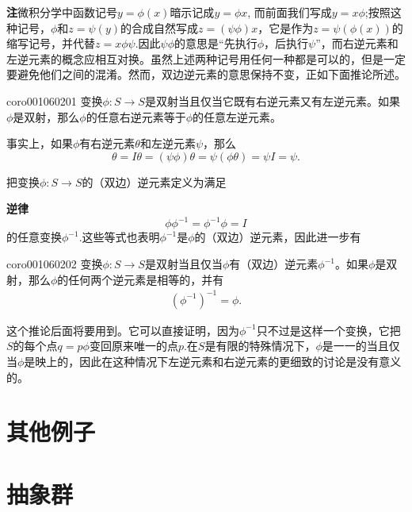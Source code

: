 \textbf{注}\quad 微积分学中函数记号$y = \phi(x)$暗示记成$y = \phi{x}$, 而前面我们写成$y = x\phi$;按照这种记号，$\phi$和$z = \psi(y)$的合成自然写成$z = (\psi\phi)x$，它是作为$z = \psi(\phi(x))$的缩写记号，并代替$z = x\phi\psi$.因此$\psi\phi$的意思是“先执行$\phi$，后执行$\psi$”，而右逆元素和左逆元素的概念应相互对换。虽然上述两种记号用任何一种都是可以的，但是一定要避免他们之间的混淆。然而，双边逆元素的意思保持不变，正如下面推论所述。

\begin{corollary}{}{coro001060201}
变换$\phi:S \to S$是双射当且仅当它既有右逆元素又有左逆元素。如果$\phi$是双射，那么$\phi$的任意右逆元素等于$\phi$的任意左逆元素。
\end{corollary}

事实上，如果$\phi$有右逆元素$\theta$和左逆元素$\psi$，那么
\[
\theta = I\theta = (\psi\phi)\theta = \psi(\phi\theta) = \psi{}I = \psi.
\]

把变换$\phi:S \to S$的（双边）逆元素定义为满足

\textbf{逆律}
\[
\phi\phi^{-1} = \phi^{-1}\phi = I
\]
的任意变换$\phi^{-1}$.这些等式也表明$\phi^{-1}$是$\phi$的（双边）逆元素，因此进一步有
\begin{corollary}{}{coro001060202}
变换$\phi:S \to S$是双射当且仅当$\phi$有（双边）逆元素$\phi^{-1}$。如果$\phi$是双射，那么$\phi$的任何两个逆元素是相等的，并有
\begin{gather}\label{equ001060204}
(\phi^{-1})^{-1} = \phi.
\end{gather}
\end{corollary}

这个推论后面将要用到。它可以直接证明，因为$\phi^{-1}$只不过是这样一个变换，它把$S$的每个点$q = p\phi$变回原来唯一的点$p$.在$S$是有限的特殊情况下，$\phi$是一一的当且仅当$\phi$是映上的，因此在这种情况下左逆元素和右逆元素的更细致的讨论是没有意义的。





\section{其他例子}\label{section0010603}



\section{抽象群}\label{section0010604}



